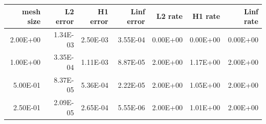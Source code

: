 \begin{tabular}{rrrrrrr}
\toprule
mesh size & L2 error & H1 error & Linf error & L2 rate & H1 rate & Linf rate \\
\midrule
2.00E+00 & 1.34E-03 & 2.50E-03 & 3.55E-04 & 0.00E+00 & 0.00E+00 & 0.00E+00 \\
1.00E+00 & 3.35E-04 & 1.11E-03 & 8.87E-05 & 2.00E+00 & 1.17E+00 & 2.00E+00 \\
5.00E-01 & 8.37E-05 & 5.36E-04 & 2.22E-05 & 2.00E+00 & 1.05E+00 & 2.00E+00 \\
2.50E-01 & 2.09E-05 & 2.65E-04 & 5.55E-06 & 2.00E+00 & 1.01E+00 & 2.00E+00 \\
\bottomrule
\end{tabular}
